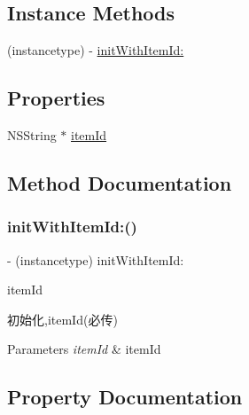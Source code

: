 \subsection*{Instance Methods}
\begin{DoxyCompactItemize}
\item 
(instancetype) -\/ \mbox{\hyperlink{interface_a_l_p_t_b_detail_param_a98e74b934089837954e6fde2caf2507d}{init\+With\+Item\+Id\+:}}
\end{DoxyCompactItemize}
\subsection*{Properties}
\begin{DoxyCompactItemize}
\item 
N\+S\+String $\ast$ \mbox{\hyperlink{interface_a_l_p_t_b_detail_param_a41ebf6fdd9ef6d474256eda061e5b053}{item\+Id}}
\end{DoxyCompactItemize}


\subsection{Method Documentation}
\mbox{\label{interface_a_l_p_t_b_detail_param_a98e74b934089837954e6fde2caf2507d}} 
\subsubsection{\texorpdfstring{init\+With\+Item\+Id\+:()}{initWithItemId:()}}
{\footnotesize\ttfamily -\/ (instancetype) init\+With\+Item\+Id\+: \begin{DoxyParamCaption}\item[{(N\+S\+String $\ast$)}]{item\+Id }\end{DoxyParamCaption}}

初始化,item\+Id(必传)


\begin{DoxyParams}{Parameters}
{\em item\+Id} & item\+Id \\
\hline
\end{DoxyParams}


\subsection{Property Documentation}
\mbox{\label{interface_a_l_p_t_b_detail_param_a41ebf6fdd9ef6d474256eda061e5b053}} 
